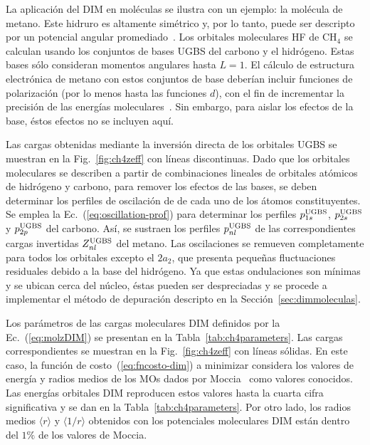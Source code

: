 La aplicación del DIM en moléculas se ilustra con un ejemplo: la 
molécula de metano. Este hidruro es altamente simétrico y, por lo tanto, 
puede ser descripto por un potencial angular 
promediado~\cite{Granados:16}. 
Los orbitales moleculares HF de CH$_4$ se calculan usando los conjuntos 
de bases UGBS del carbono y el hidrógeno. Estas bases sólo consideran 
momentos angulares hasta $L=1$. El cálculo de estructura electrónica de 
metano con estos conjuntos de base deberían incluir funciones de 
polarización (por lo menos hasta las funciones $d$), con el fin de 
incrementar la precisión de las energías moleculares~\cite{Rothenberg:71,
Hariharan:72}. Sin embargo, para aislar los efectos de la base, éstos 
efectos no se incluyen aquí. 

Las cargas obtenidas mediante la inversión directa de los orbitales UGBS 
se muestran en la Fig.~\ref{fig:ch4zeff} con líneas discontinuas. Dado 
que los orbitales moleculares se describen a partir de combinaciones 
lineales de orbitales atómicos de hidrógeno y carbono, para remover los 
efectos de las bases, se deben determinar los perfiles de oscilación de 
de cada uno de los átomos constituyentes. Se emplea la 
Ec.~(\ref{eq:oscillation-prof}) para determinar los perfiles 
$p_{1s}^{\mbox{\scriptsize UGBS}}$, $p_{2s}^{\mbox{\scriptsize UGBS}}$ y 
$p_{2p}^{\mbox{\scriptsize UGBS}}$ del carbono. Así, se sustraen los 
perfiles $p_{nl}^{\mbox{\scriptsize UGBS}}$ de las correspondientes 
cargas invertidas $Z_{nl}^{\mbox{\scriptsize UGBS}}$ del metano. Las 
oscilaciones se remueven completamente para todos los orbitales excepto 
el $2a_2$, que presenta pequeñas fluctuaciones residuales debido a la 
base del hidrógeno. Ya que estas ondulaciones son mínimas y se ubican 
cerca del núcleo, éstas pueden ser despreciadas y se procede a 
implementar el método de depuración descripto en la 
Sección~\ref{sec:dimmoleculas}. 

Los parámetros de las cargas moleculares DIM definidos por la 
Ec.~(\ref{eq:molzDIM}) se presentan en la Tabla~\ref{tab:ch4parameters}. 
Las cargas correspondientes se muestran en la Fig.~\ref{fig:ch4zeff} con 
líneas sólidas. En este caso, la función de costo~(\ref{eq:fncosto-dim}) 
a minimizar considera los valores de energía y radios medios de los 
MOs dados por Moccia~\cite{Moccia:69} como valores conocidos. Las 
energías orbitales DIM reproducen estos valores hasta la cuarta cifra 
significativa y se dan en la Tabla~\ref{tab:ch4parameters}. Por otro 
lado, los radios medios $\langle r\rangle$ y $\langle 1/r\rangle$ 
obtenidos con los potenciales moleculares DIM están dentro del $1\%$ de 
los valores de Moccia.


